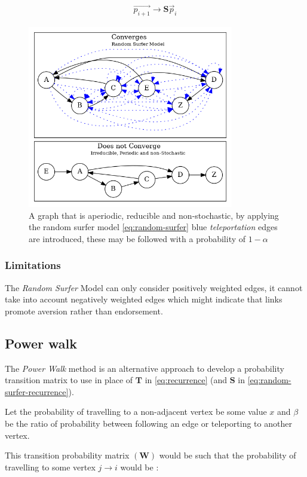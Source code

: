 \documentclass[11pt]{article}
\begin{document}
\begin{align}
\vec{p_{i+1}} \rightarrow \mathbf{S} \vec{p}_{i} \label{eq:random-surfer-recurrence}
\end{align}



\begin{figure}[htbp]
\centering
\includegraphics[width=9cm]{media/dot/random_surfer.dot.png}
\caption{\label{fig:rseg}A graph that is aperiodic, reducible and non-stochastic, by applying the random surfer model \eqref{eq:random-surfer} blue \emph{teleportation} edges are introduced, these may be followed with a probability of \(1 - \alpha\)}
\end{figure}
\subsubsection{Limitations}
\label{sec:orga6434d8}
The \emph{Random Surfer} Model can only consider positively weighted edges, it cannot
take into account negatively weighted edges which might indicate that
links promote aversion rather than endorsement.
\subsection{Power walk}
\label{pwalk}
The \emph{Power Walk} method is an alternative approach to develop a probability
transition matrix to use in place of \(\mathbf{T}\) in \eqref{eq:recurrence} (and \(\mathbf{S}\) in \eqref{eq:random-surfer-recurrence}).

Let the probability of travelling to a non-adjacent vertex be some value \(x\)
and \(\beta\) be the ratio of probability between following an edge or
teleporting to another vertex.

This transition probability matrix \(\left( \mathbf{W}\right)\) would be such that the probability of
travelling to some vertex \(j \rightarrow i\) would be :
\end{document}
